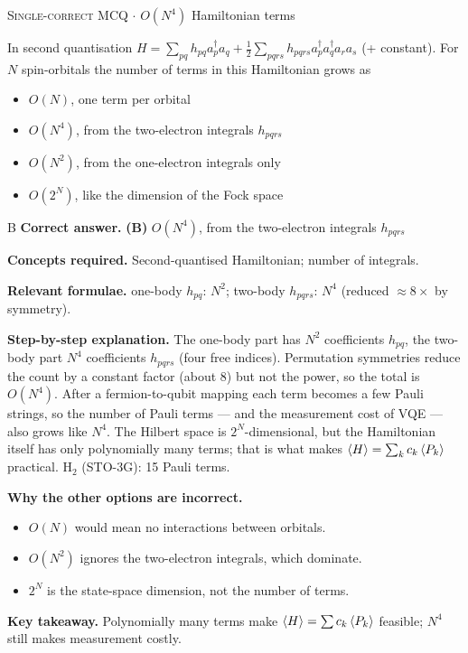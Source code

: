 \documentclass[11pt,a4paper]{article}
\newcommand{\optlabel}[1]{\textbf{(#1)}}
\newcommand{\correctlabel}[1]{\textcolor{okgreen}{\textbf{(#1)}\,\ding{51}}}
\newenvironment{qitem}[1]{\begin{list}{}{\setlength{\leftmargin}{3.3em}\setlength{\labelwidth}{3.1em}%
  \setlength{\labelsep}{0.2em}\setlength{\topsep}{3pt}\setlength{\parsep}{3pt}}\item[\textbf{Q.#1}\hfill]}{\end{list}}
\newcommand{\qsep}{\par\vspace{2pt}{\color{black!15}\hrule}\vspace{4pt}}
\newcommand{\qmeta}[2]{{\footnotesize\color{black!60}\textsc{#1} \;$\cdot$\; #2}\par}
\begin{document}
\begin{qitem}{12}
\qmeta{Single-correct MCQ}{$O(N^4)$ Hamiltonian terms}
In second quantisation $H = \sum_{pq}h_{pq}a_p^\dagger a_q + \tfrac12\sum_{pqrs}h_{pqrs}a_p^\dagger a_q^\dagger a_ra_s$ (+ constant). For $N$ spin-orbitals the number of
terms in this Hamiltonian grows as
\begin{itemize}[leftmargin=2.6em, labelsep=0.4em, itemsep=2pt, topsep=3pt]
\item[\optlabel{A}] $O(N)$, one term per orbital
\item[\correctlabel{B}] $O(N^4)$, from the two-electron integrals $h_{pqrs}$
\item[\optlabel{C}] $O(N^2)$, from the one-electron integrals only
\item[\optlabel{D}] $O(2^N)$, like the dimension of the Fock space
\end{itemize}
\end{qitem}
\begin{solbox}{B}
\textbf{\color{brand}Correct answer.} \textcolor{okgreen}{\textbf{(B)}} $O(N^4)$, from the two-electron integrals $h_{pqrs}$

\textbf{\color{brand}Concepts required.} Second-quantised Hamiltonian; number of integrals.

\textbf{\color{brand}Relevant formulae.} one-body $h_{pq}$: $N^2$; two-body $h_{pqrs}$: $N^4$ (reduced $\approx 8\times$ by symmetry).

\textbf{\color{brand}Step-by-step explanation.} The one-body part has $N^2$ coefficients $h_{pq}$, the two-body part $N^4$ coefficients $h_{pqrs}$ (four free indices). Permutation symmetries
reduce the count by a constant factor (about 8) but not the power, so the total is $O(N^4)$. After a fermion-to-qubit mapping each
term becomes a few Pauli strings, so the number of Pauli terms --- and the measurement cost of VQE --- also grows like $N^4$.
The Hilbert space is $2^N$-dimensional, but the Hamiltonian itself has only polynomially many terms; that is what makes
$\braket{H} = \sum_kc_k\braket{P_k}$ practical. H$_2$ (STO-3G): 15 Pauli terms.

\textbf{\color{brand}Why the other options are incorrect.}
\begin{itemize}[leftmargin=2.4em, itemsep=1pt, topsep=2pt]
\item[\textbf{(A)}] $O(N)$ would mean no interactions between orbitals.
\item[\textbf{(C)}] $O(N^2)$ ignores the two-electron integrals, which dominate.
\item[\textbf{(D)}] $2^N$ is the state-space dimension, not the number of terms.
\end{itemize}
\textbf{\color{brand}Key takeaway.} Polynomially many terms make $\braket H = \sum c_k\braket{P_k}$ feasible; $N^4$ still makes measurement costly.
\end{solbox}
\qsep
\end{document}
